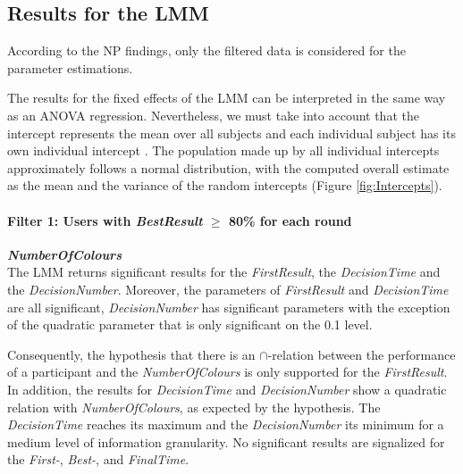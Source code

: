 \subsection{Results for the \ac{LMM}}

According to the \acl{NP} findings, only the filtered data is considered for the parameter estimations.

The results for the fixed effects of the \ac{LMM} can be interpreted in the same way as an ANOVA regression. Nevertheless, we must take into account that the intercept represents the mean over all subjects and each individual subject has its own individual intercept \citep{Seltman2012}. The population made up by all individual intercepts approximately follows a normal distribution, with the computed overall estimate as the mean and the variance of the random intercepts (Figure \ref{fig:Intercepts}).

\paragraph{Filter 1: Users with \textit{BestResult} $\geq$ 80\% for each round}
\textbf{\textit{NumberOfColours} }\\
The \ac{LMM} returns significant results for the \textit{FirstResult}, the \textit{DecisionTime} and the \textit{DecisionNumber}.  Moreover, the parameters of \textit{FirstResult}  and \textit{DecisionTime} are all significant, \textit{DecisionNumber} has significant parameters with the exception of the quadratic parameter that is only significant on the 0.1 level.

Consequently, the hypothesis that there is an \textbf{$\cap$}-relation between the performance of a participant and the \textit{NumberOfColours} is only supported for the \textit{FirstResult}. In addition, the results for \textit{DecisionTime} and \textit{DecisionNumber} show a quadratic relation with \textit{NumberOfColours}, as expected by the hypothesis. The \textit{DecisionTime} reaches its maximum and the \textit{DecisionNumber} its minimum for a medium level of information granularity. No significant results are signalized for the \textit{First-}, \textit{Best-}, and \textit{FinalTime}.

